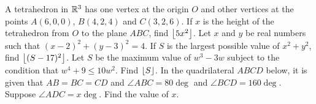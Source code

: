 \begin{enumerate}
    \begin{center}
    \end{center}
    \hyperrefitem[A::2022-O-1-7] A tetrahedron in $\mathbb{R}^3$ has one vertex at the origin $O$ and other vertices at the points $A(6, 0, 0)$, $B(4, 2, 4)$ and $C(3, 2, 6)$. If $x$ is the height of the tetrahedron from $O$ to the plane $ABC$, find $\left\lfloor 5x^2 \right\rfloor$.
    \hyperrefitem[A::2022-O-1-8] Let $x$ and $y$ be real numbers such that $(x-2)^2 + (y-3)^2 = 4$. If $S$ is the largest possible value of $x^2 + y^2$, find $\left\lfloor (S-17)^2 \right\rfloor$.
    \hyperrefitem[A::2022-O-1-9] Let $S$ be the maximum value of $w^3 - 3w$ subject to the condition that $w^4 + 9 \leq 10w^2$. Find $\left\lfloor S \right\rfloor$.
    \hyperrefitem[A::2022-O-1-10] In the quadrilateral $ABCD$ below, it is given that $AB = BC = CD$ and $\angle ABC = 80\deg$ and $\angle BCD = 160 \deg$. Suppose $\angle ADC = x\deg$. Find the value of $x$.

    \begin{center}
\end{center}
\end{enumerate}
